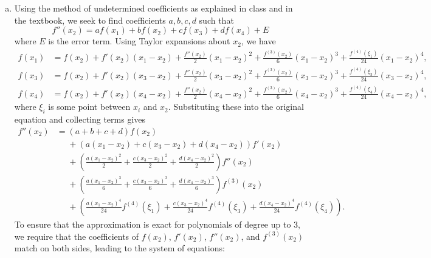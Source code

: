 \documentclass{article}
\begin{document}
\begin{enumerate}[(a)]
  \item Using the method of undetermined coefficients as explained in class and in the textbook, we seek to find coefficients
        $a,b,c,d$ such that
        \begin{equation}
          f''(x_2) = a f(x_1) + b f(x_2) + c f(x_3) + d f(x_4) + E
        \end{equation}
        where $E$ is the error term. Using Taylor expansions about $x_2$, we have
        \begin{align}
          f(x_1) & = f(x_2) + f'(x_2)(x_1-x_2) + \frac{f''(x_2)}{2}(x_1-x_2)^2 + \frac{f^{(3)}(x_2)}{6}(x_1-x_2)^3 + \frac{f^{(4)}(\xi_1)}{24}(x_1-x_2)^4, \\
          f(x_3) & = f(x_2) + f'(x_2)(x_3-x_2) + \frac{f''(x_2)}{2}(x_3-x_2)^2 + \frac{f^{(3)}(x_2)}{6}(x_3-x_2)^3 + \frac{f^{(4)}(\xi_3)}{24}(x_3-x_2)^4, \\
          f(x_4) & = f(x_2) + f'(x_2)(x_4-x_2) + \frac{f''(x_2)}{2}(x_4-x_2)^2 + \frac{f^{(3)}(x_2)}{6}(x_4-x_2)^3 + \frac{f^{(4)}(\xi_4)}{24}(x_4-x_2)^4,
        \end{align}
        where $\xi_i$ is some point between $x_i$ and $x_2$. Substituting these into
        the original equation and collecting terms gives
        \begin{align}
          f''(x_2) & = (a+b+c+d)f(x_2)                                                                                     \\
                   & \phantom{=}+ (a(x_1-x_2)+c(x_3-x_2)+d(x_4-x_2))f'(x_2)                                               \\
                   & \phantom{=}+ \left(\frac{a(x_1-x_2)^2}{2} + \frac{c(x_3-x_2)^2}{2} + \frac{d(x_4-x_2)^2}{2}\right)f''(x_2)               \\
                   & \phantom{=}+ \left(\frac{a(x_1-x_2)^3}{6} + \frac{c(x_3-x_2)^3}{6} + \frac{d(x_4-x_2)^3}{6}\right)f^{(3)}(x_2)               \\
                   & \phantom{=}+ \left(\frac{a(x_1-x_2)^4}{24}f^{(4)}(\xi_1) + \frac{c(x_3-x_2)^4}{24}f^{(4)}(\xi_3) + \frac{d(x_4-x_2)^4}{24}f^{(4)}(\xi_4)\right).
        \end{align}
        To ensure that the approximation is exact for polynomials of degree up to 3, we require that the coefficients of $f(x_2)$, $f'(x_2)$, $f''(x_2)$, and $f^{(3)}(x_2)$ match on both sides, leading to the system of equations:
        \begin{align}

\end{align}
\end{enumerate}
\end{document}
